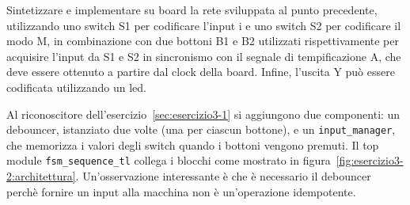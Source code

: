 \label{sec:esercizio3-2}

\begin{traccia}
Sintetizzare e implementare su board la rete sviluppata al punto precedente, utilizzando uno switch S1 per codificare l'input i e uno switch S2 per codificare il modo M, in combinazione con due bottoni B1 e B2 utilizzati rispettivamente per acquisire l'input da S1 e S2 in sincronismo con il segnale di tempificazione A, che deve essere ottenuto a partire dal clock della board. Infine, l'uscita Y può essere codificata utilizzando un led.
\end{traccia}

\progetto

Al riconoscitore dell'esercizio~\ref{sec:esercizio3-1} si aggiungono due componenti: un debouncer, istanziato due volte (una per ciascun bottone), e un \texttt{input\_manager}, che memorizza i valori degli switch quando i bottoni vengono premuti. Il top module \texttt{fsm\_sequence\_tl} collega i blocchi come mostrato in figura~\ref{fig:esercizio3-2:architettura}. Un'osservazione interessante è che è necessario il debouncer perchè fornire un input alla macchina non è un'operazione idempotente.


